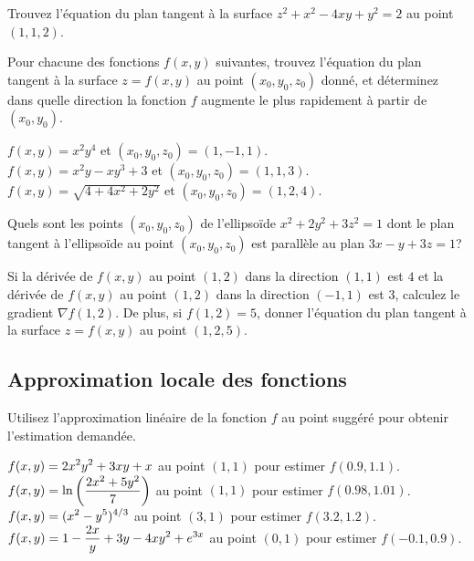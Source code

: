\begin{question}[\eng]
Trouvez l'équation du plan tangent à la surface
$z^2 + x^2 - 4xy + y^2 = 2$ au point $(1,1,2)$.
\label{15Q14}
\end{question}

\begin{question}[\eng]
Pour chacune des fonctions $f(x,y)$ suivantes, trouvez l'équation du
plan tangent à la surface $z=f(x,y)$ au point $(x_0,y_0,z_0)$ donné,
et déterminez dans quelle direction la fonction $f$ augmente le
plus rapidement à partir de $(x_0,y_0)$.

 $f(x,y) = x^2 y^4$ et $(x_0,y_0,z_0) = (1,-1,1)$.\\
 $f(x,y) = x^2y - xy^3 + 3$ et $(x_0,y_0,z_0) = (1,1,3)$.\\
 $f(x,y) = \sqrt{4+4x^2+2y^2}$ et $(x_0,y_0,z_0) = (1,2,4)$.
\label{15Q15}
\end{question}

\begin{question}[\eng]
Quels sont les points $(x_0,y_0,z_0)$ de l'ellipsoïde $x^2+2y^2+3z^2 = 1$
dont le plan tangent à l'ellipsoïde au point $(x_0,y_0,z_0)$ est
parallèle au plan $3x - y + 3z = 1$?
\label{15Q16}
\end{question}

\begin{question}[\eng]
Si la dérivée de $f(x,y)$ au point $(1,2)$ dans la direction $(1,1)$
est $4$ et la dérivée de $f(x,y)$ au point $(1,2)$ dans la direction
$(-1,1)$ est $3$, calculez le gradient $\nabla f(1,2)$.  De plus, si
$f(1,2) = 5$, donner l'équation du plan tangent à la surface
$z=f(x,y)$ au point $(1,2,5)$.
\label{15Q17}
\end{question}

\subsection{Approximation locale des fonctions}

\begin{question}
Utilisez l'approximation linéaire de la fonction $f$ au point suggéré
pour obtenir l'estimation demandée.

 $\displaystyle f(x,y)=2x^2y^2+3xy+x$ au point $(1,1)$ pour
estimer $f(0.9,1.1)$.\\
 $\displaystyle f(x,y) =  \ln\left(\frac{2x^2+5y^2}{7}\right)$
au point $(1,1)$ pour estimer $f(0.98,1.01)$.\\
 $\displaystyle f(x,y) = (x^2-y^5)^{4/3}$ au point $(3,1)$
pour estimer $f(3.2,1.2)$.\\
 $\displaystyle f(x,y)= 1- \frac{2x}{y}+3y-4xy^2+e^{3x}$ au
point $(0,1)$ pour estimer $f(-0.1,0.9)$.
\label{15Q18}
\end{question}

